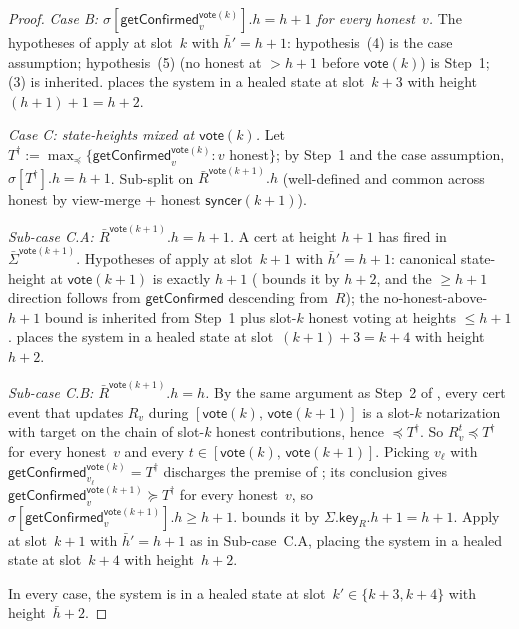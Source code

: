 \documentclass{article}
\newcommand{\key}{\mathsf{key}}
\newcommand{\syncer}{\mathsf{syncer}}
\newcommand{\vote}{\mathsf{vote}}
\newcommand{\comm}[1]{\bar{#1}}
\newcommand{\getConfirmed}{\textsf{getConfirmed}\xspace}
\theoremstyle{plain}
\theoremstyle{definition}
\theoremstyle{remark}
\begin{document}
\begin{proof}
\emph{Case B: $\sigma[\getConfirmed_v^{\vote(k)}].h = h+1$ for every honest~$v$.}
The hypotheses of  apply at slot~$k$ with $\comm{h}' = h+1$: hypothesis~(4) is the case assumption; hypothesis~(5) (no honest at $> h+1$ before $\vote(k)$) is Step~1; (3) is inherited.  places the system in a healed state at slot~$k+3$ with height~$(h+1)+1 = h+2$.

\emph{Case C: state-heights mixed at $\vote(k)$.}
Let $T^\dagger := \max_\preceq \{\getConfirmed_v^{\vote(k)} : v \text{ honest}\}$; by Step~1 and the case assumption, $\sigma[T^\dagger].h = h+1$. Sub-split on $\comm{R}^{\vote(k+1)}.h$ (well-defined and common across honest by view-merge + honest $\syncer(k+1)$).

\emph{Sub-case C.A: $\comm{R}^{\vote(k+1)}.h = h+1$.}
A cert at height $h+1$ has fired in $\comm{\Sigma}^{\vote(k+1)}$. Hypotheses of  apply at slot~$k+1$ with $\comm{h}' = h+1$: canonical state-height at $\vote(k+1)$ is exactly $h+1$ ( bounds it by $h+2$, and the $\geq h+1$ direction follows from $\getConfirmed$ descending from~$R$); the no-honest-above-$h+1$ bound is inherited from Step~1 plus slot-$k$ honest voting at heights $\leq h+1$.  places the system in a healed state at slot~$(k+1)+3 = k+4$ with height~$h+2$.

\emph{Sub-case C.B: $\comm{R}^{\vote(k+1)}.h = h$.}
By the same argument as Step~2 of , every cert event that updates $R_v$ during $[\vote(k),\, \vote(k+1)]$ is a slot-$k$ notarization with target on the chain of slot-$k$ honest contributions, hence $\preceq T^\dagger$. So $R_v^t \preceq T^\dagger$ for every honest~$v$ and every $t \in [\vote(k),\, \vote(k+1)]$. Picking $v_\ell$ with $\getConfirmed_{v_\ell}^{\vote(k)} = T^\dagger$ discharges the premise of ; its conclusion gives $\getConfirmed_v^{\vote(k+1)} \succeq T^\dagger$ for every honest~$v$, so $\sigma[\getConfirmed_v^{\vote(k+1)}].h \geq h+1$.  bounds it by $\Sigma.\key_R.h + 1 = h+1$. Apply  at slot~$k+1$ with $\comm{h}' = h+1$ as in Sub-case~C.A, placing the system in a healed state at slot~$k+4$ with height~$h+2$.

In every case, the system is in a healed state at slot~$k' \in \{k+3, k+4\}$ with height~$\comm{h}+2$.
\end{proof}
\end{document}
